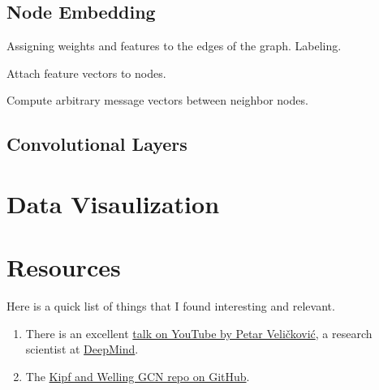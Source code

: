 \subsection{\label{sec:embedding}Node Embedding}

\justifying
Assigning weights and features to the edges of the graph. Labeling.

Attach feature vectors to nodes.

Compute arbitrary message vectors between neighbor nodes.

\subsection{\label{sec:conv}Convolutional Layers}

\section{\label{sec:visualization}Data Visaulization}

\section{\label{sec:reading}Resources}

\justifying
Here is a quick list of things that I found interesting and relevant.

\begin{raggedright}
	\begin{enumerate}
		\item There is an excellent \href{https://www.youtube.com/watch?v=8owQBFAHw7E}{talk on YouTube by Petar Veličković}, a research scientist at \href{https://deepmind.com/about}{DeepMind}.
		\item The \href{https://github.com/tkipf/gcn}{Kipf and Welling GCN repo on GitHub}.
    \end{enumerate}
\end{raggedright}
\vspace{2mm}

\clearpage
\begin{versionhistory}
\end{versionhistory}
\nocite{*}




